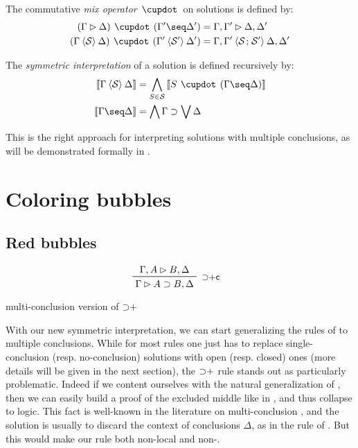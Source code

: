 \begin{definition}
  The commutative \emph{mix operator} $\mix$ on solutions is defined by:
  \begin{align*}
    (\Gamma \J \Delta) \mix (\Gamma' \seq \Delta') &=
      \Gamma, \Gamma' \J \Delta, \Delta' \\
    (\Gamma \piq{\cS} \Delta) \mix (\Gamma' \piq{\mathcal{S'}} \Delta') &=
      \Gamma, \Gamma' \piq{\cS \sep \mathcal{S'}} \Delta, \Delta' \\
  \end{align*}
\end{definition}

\begin{definition}
  The \emph{symmetric interpretation} of a solution is defined recursively by:
  \begin{align*}
    \sint{\Gamma \piq{\cS} \Delta} &=
      \bigwedge_{S \in \cS} \sint{S \mix (\Gamma \seq \Delta)} \\
    \sint{\Gamma \seq \Delta} &=
      \bigwedge \Gamma \limp \bigvee \Delta
  \end{align*}
\end{definition}

This is the right approach for interpreting solutions with multiple conclusions,
as will be demonstrated formally in .

\section{Coloring bubbles}

\subsection{Red bubbles}

\begin{marginfigure}
  $$
  \R[\mathsf{{\limp}{+}c}]
    {\Gamma, A \J B, \Delta}
    {\Gamma \J A \limp B, \Delta}
  $$
  \caption{ multi-conclusion version of ${\supset}{+}$}
\end{marginfigure}

With our new symmetric interpretation, we can start generalizing the rules of
 to multiple conclusions. While for most rules one just has to replace
single-conclusion (resp. no-conclusion) solutions with open (resp. closed) ones
(more details will be given in the next section), the ${\supset}{+}$ rule stands
out as particularly problematic. Indeed if we content ourselves with the natural
generalization {} of , then we can
easily build a proof of the excluded middle like in , and thus
collapse to  logic. This fact is well-known in the literature on
multi-conclusion  , and the solution is usually to
discard the context of conclusions $\Delta$, as in the {} rule
of . But this would make our rule both non-local and
non-.

